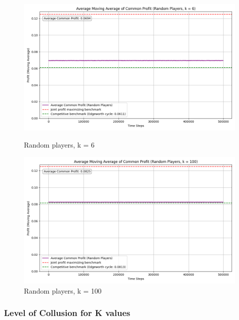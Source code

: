 \documentclass{article}
\begin{document}
\begin{figure}[H]
    \centering
    \begin{minipage}{0.75\linewidth}
        \centering
        \includegraphics[width=\linewidth]{RANDOM PLAYER, K=6.png}
        \caption{Random players, k = 6 }
        \label{fig: RANDOM K = 6}
    \end{minipage}
    \hfill
    \begin{minipage}{0.75\linewidth}
        \centering
        \includegraphics[width=\linewidth]{RANDOM PLAYER, K=100.png}
        \caption{Random players, k = 100}
        \label{fig: RANDOM K = 100}
    \end{minipage}
\end{figure}



\subsubsection{Level of Collusion for K values}
\label{Level of Collusion for K values}
\end{document}
